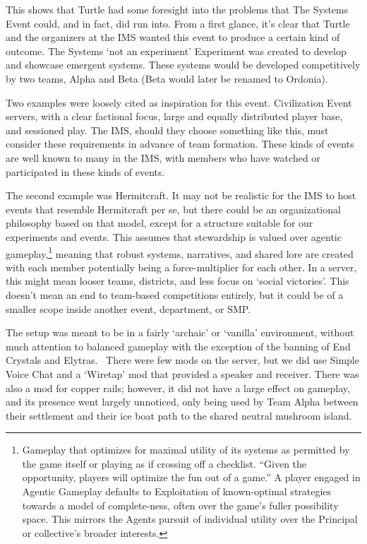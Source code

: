 This shows that Turtle had some foresight into the problems that The Systems Event could, and in fact, did run into. From a first glance, it's clear that Turtle and the organizers at the IMS wanted this event to produce a certain kind of outcome. The Systems `not an experiment' Experiment was created to develop and showcase emergent systems. These systems would be developed competitively by two teams, Alpha and Beta (Beta would later be renamed to Ordonia).

Two examples were loosely cited as inspiration for this event. Civilization Event servers, with a clear factional focus, large and equally distributed player base, and sessioned play. The IMS, should they choose something like this, must consider these requirements in advance of team formation. These kinds of events are well known to many in the IMS, with members who have watched or participated in these kinds of events.

The second example was Hermitcraft. It may not be realistic for the IMS to host events that resemble Hermitcraft per se, but there could be an organizational philosophy based on that model, except for a structure suitable for our experiments and events. This assumes that stewardship is valued over agentic gameplay,\footnote{Gameplay that optimizes for maximal utility of its systems as permitted by the game itself or playing as if crossing off a checklist. “Given the opportunity, players will optimize the fun out of a game.” A player engaged in Agentic Gameplay defaults to Exploitation of known-optimal strategies towards a model of complete-ness, often over the game's fuller possibility space. This mirrors the Agents pursuit of individual utility over the Principal or collective's broader interests.} meaning that robust systems, narratives, and shared lore are created with each member potentially being a force-multiplier for each other. In a server, this might mean looser teams, districts, and less focus on `social victories'. This doesn't mean an end to team-based competitions entirely, but it could be of a smaller scope inside another event, department, or SMP.

The setup was meant to be in a fairly `archaic' or `vanilla' environment, without much attention to balanced gameplay with the exception of the banning of End Crystals and Elytras.~\citep{Turtle(2026b),Turtle(2026c)} There were few mods on the server, but we did use Simple Voice Chat and a `Wiretap' mod that provided a speaker and receiver. There was also a mod for copper rails; however, it did not have a large effect on gameplay, and its presence went largely unnoticed, only being used by Team Alpha between their settlement and their ice boat path to the shared neutral mushroom island.

